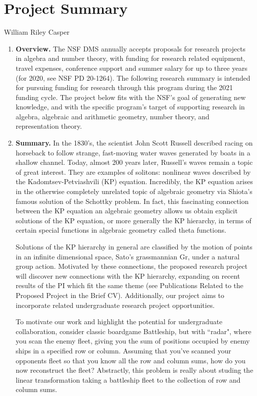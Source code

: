 \documentclass[11pt,letterpaper]{article}
\newcommand{\required}[1]{\section*{\hfil #1\hfil}}                    %
\theoremstyle{definition}
\newcommand{\Gr}{\text{Gr}}
\begin{document}
\required{Project Summary}
\begin{center}
William Riley Casper
\end{center}

\begin{enumerate}[]
\item{\textbf{Overview.}}
The NSF DMS annually accepts proposals for research projects in algebra and number theory, with funding for research related equipment, travel expenses, conference support and summer salary for up to three years (for 2020, see NSF PD 20-1264).
The following research summary is intended for pursuing funding for research through this program during the 2021 funding cycle.
The project below fits with the NSF's goal of generating new knowledge, and with the specific program's target of supporting research in algebra, algebraic and arithmetic geometry, number theory, and representation theory.

\item{\textbf{Summary.}}
In the 1830's, the scientist John Scott Russell described racing on horseback to follow strange, fast-moving water waves generated by boats in a shallow channel.
Today, almost 200 years later, Russell's waves remain a topic of great interest.
They are examples of solitons: nonlinear waves described by the Kadomtsev-Petviashvili (KP) equation.
Incredibly, the KP equation arises in the otherwise completely unrelated topic of algebraic geometry via Shiota's famous solution of the Schottky problem.
In fact, this fascinating connection between the KP equation an algebraic geometry allows us obtain explicit solutions of the KP equation, or more generally the KP hierarchy, in terms of certain special functions in algebraic geometry called theta functions.

Solutions of the KP hierarchy in general are classified by the motion of points in an infinite dimensional space, Sato's grassmannian $\Gr$, under a natural group action.
Motivated by these connections, the proposed research project will discover new connections with the KP hierarchy, expanding on recent results of the PI which fit the same theme (see Publications Related to the Proposed Project in the Brief CV).
Additionally, our project aims to incorporate related undergraduate research project opportunities.

To motivate our work and highlight the potential for undergraduate collaboration, consider classic boardgame Battleship, but with ``radar", where you scan the enemy fleet, giving you the sum of positions occupied by enemy ships in a specified row or column.
Assuming that you've scanned your opponents fleet so that you know all the row and column sums, how do you now reconstruct the fleet?
Abstractly, this problem is really about studing the linear transformation taking a battleship fleet to the collection of row and column sums.


\end{enumerate}
\end{document}
